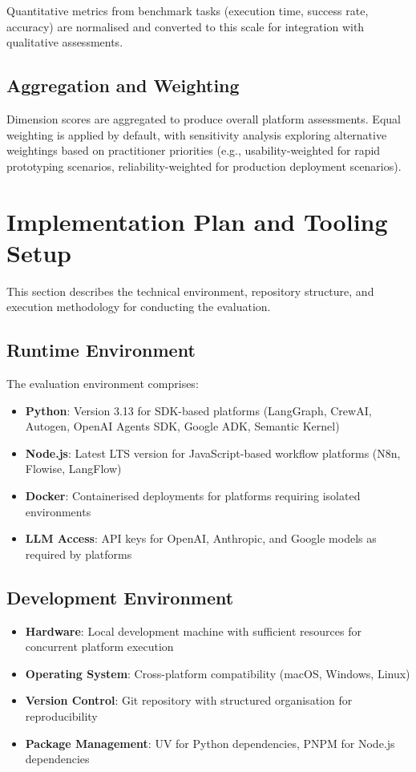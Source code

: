 \documentclass[]
{UCD_CS_FYP_Report}
\begin{document}
Quantitative metrics from benchmark tasks (execution time, success rate, accuracy) are normalised and converted to this scale for integration with qualitative assessments.

\subsection{Aggregation and Weighting}

Dimension scores are aggregated to produce overall platform assessments. Equal weighting is applied by default, with sensitivity analysis exploring alternative weightings based on practitioner priorities (e.g., usability-weighted for rapid prototyping scenarios, reliability-weighted for production deployment scenarios).

\section{Implementation Plan and Tooling Setup}

This section describes the technical environment, repository structure, and execution methodology for conducting the evaluation.

\subsection{Runtime Environment}

The evaluation environment comprises:

\begin{itemize}
  \item \textbf{Python}: Version 3.13 for SDK-based platforms (LangGraph, CrewAI, Autogen, OpenAI Agents SDK, Google ADK, Semantic Kernel)
  \item \textbf{Node.js}: Latest LTS version for JavaScript-based workflow platforms (N8n, Flowise, LangFlow)
  \item \textbf{Docker}: Containerised deployments for platforms requiring isolated environments
  \item \textbf{LLM Access}: API keys for OpenAI, Anthropic, and Google models as required by platforms
\end{itemize}

\subsection{Development Environment}

\begin{itemize}
  \item \textbf{Hardware}: Local development machine with sufficient resources for concurrent platform execution
  \item \textbf{Operating System}: Cross-platform compatibility (macOS, Windows, Linux)
  \item \textbf{Version Control}: Git repository with structured organisation for reproducibility
  \item \textbf{Package Management}: UV for Python dependencies, PNPM for Node.js dependencies
\end{itemize}
\end{document}
